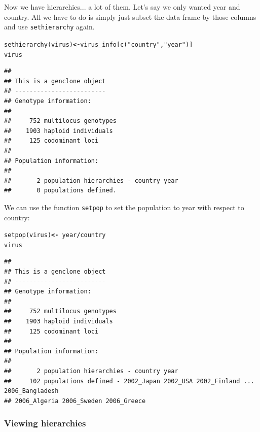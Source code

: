 \documentclass[letterpaper]{article}\usepackage[]{graphicx}\usepackage[]{color}
\makeatletter
\newcommand{\hlstr}[1]{\textcolor[rgb]{0.651,0.522,0}{#1}}%
\newcommand{\hlopt}[1]{\textcolor[rgb]{1,0,0.502}{\textbf{#1}}}%
\newcommand{\hlstd}[1]{\textcolor[rgb]{0,0,0}{#1}}%
\newcommand{\hlkwb}[1]{\textcolor[rgb]{0.502,0.502,0.753}{\textbf{#1}}}%
\newcommand{\hlkwd}[1]{\textcolor[rgb]{0,0.267,0.4}{#1}}%
\newenvironment{kframe}{%
 \def\at@end@of@kframe{}%
 \ifinner\ifhmode%
  \def\at@end@of@kframe{\end{minipage}}%
  \begin{minipage}{\columnwidth}%
 \fi\fi%
 \def\FrameCommand##1{\hskip\@totalleftmargin \hskip-\fboxsep
 \colorbox{shadecolor}{##1}\hskip-\fboxsep
     \hskip-\linewidth \hskip-\@totalleftmargin \hskip\columnwidth}%
 \MakeFramed {\advance\hsize-\width
   \@totalleftmargin\z@ \linewidth\hsize
   \@setminipage}}%
 {\par\unskip\endMakeFramed%
 \at@end@of@kframe}
\newenvironment{knitrout}{}{} %
\makeatother
\begin{document}
\noindent
Now we have hierarchies... a lot of them. Let's say we only wanted year and
country. All we have to do is simply just subset the data frame by those columns
and use \texttt{sethierarchy} again.

\begin{knitrout}\footnotesize
{}\color{fgcolor}\begin{kframe}
\begin{alltt}
\hlkwd{sethierarchy}\hlstd{(virus)} \hlkwb{<-} \hlstd{virus_info[}\hlkwd{c}\hlstd{(}\hlstr{"country"}\hlstd{,} \hlstr{"year"}\hlstd{)]}
\hlstd{virus}
\end{alltt}
\begin{verbatim}
## 
## This is a genclone object
## -------------------------
## Genotype information:
## 
##     752 multilocus genotypes
##    1903 haploid individuals
##     125 codominant loci
## 
## Population information:
## 
##       2 population hierarchies - country year
##       0 populations defined.
\end{verbatim}
\end{kframe}
\end{knitrout}

\noindent
We can use the function \texttt{setpop} to set the population to year with
respect to country:

\begin{knitrout}\footnotesize
{}\color{fgcolor}\begin{kframe}
\begin{alltt}
\hlkwd{setpop}\hlstd{(virus)} \hlkwb{<-} \hlopt{~}\hlstd{year}\hlopt{/}\hlstd{country}
\hlstd{virus}
\end{alltt}
\begin{verbatim}
## 
## This is a genclone object
## -------------------------
## Genotype information:
## 
##     752 multilocus genotypes
##    1903 haploid individuals
##     125 codominant loci
## 
## Population information:
## 
##       2 population hierarchies - country year
##     102 populations defined - 2002_Japan 2002_USA 2002_Finland ... 2006_Bangladesh 
## 2006_Algeria 2006_Sweden 2006_Greece
\end{verbatim}
\end{kframe}
\end{knitrout}


\subsubsection{Viewing hierarchies}
\label{data.manip:hier:view}
\end{document}
